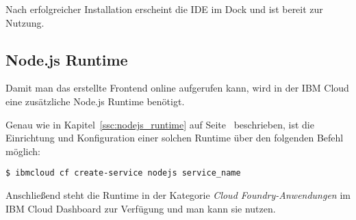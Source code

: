 Nach erfolgreicher Installation erscheint die IDE im Dock und ist bereit zur Nutzung.

\subsection{Node.js Runtime}
Damit man das erstellte Frontend online aufgerufen kann, wird in der IBM Cloud eine zusätzliche Node.js Runtime
benötigt.

Genau wie in Kapitel~\ref{ssc:nodejs_runtime} auf Seite~\pageref{ssc:nodejs_runtime} beschrieben, ist die Einrichtung
und Konfiguration einer solchen Runtime über den folgenden Befehl möglich:

\begin{lstlisting}[caption=Instanziierung der Node.js Runtime, label=ls:vorbereitung_nodejsdashboard]
    $ ibmcloud cf create-service nodejs service_name
\end{lstlisting}

Anschließend steht die Runtime in der Kategorie \textit{Cloud Foundry-Anwendungen} im IBM Cloud Dashboard zur Verfügung
und man kann sie nutzen.
